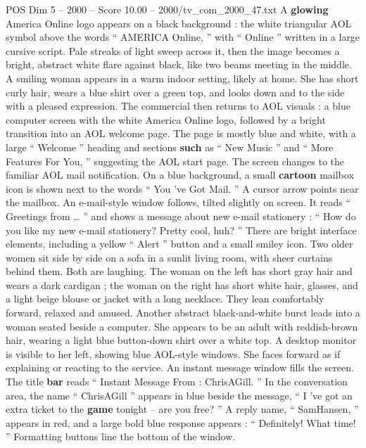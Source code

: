 \begin{textsample}{POS Dim 5 – 2000 – Score 10.00 – 2000/tv\_com\_2000\_47.txt}  \label{ex:f5_pos_023}
A \textbf{glowing} America Online logo appears on a black background : the white triangular AOL symbol above the words “ AMERICA Online, ” with “ Online ” written in a large cursive script.
Pale streaks of light sweep across it, then the image becomes a bright, abstract white flare against black, like two beams meeting in the middle.
A smiling woman appears in a warm indoor setting, likely at home.
She has short curly hair, wears a blue shirt over a green top, and looks down and to the side with a pleased expression.
The commercial then returns to AOL visuals : a blue computer screen with the white America Online logo, followed by a bright transition into an AOL welcome page.
The page is mostly blue and white, with a large “ Welcome ” heading and sections \textbf{such} as “ New Music ” and “ More Features For You, ” suggesting the AOL start page.
The screen changes to the familiar AOL mail notification.
On a blue background, a small \textbf{cartoon} mailbox icon is shown next to the words “ You ’ve Got Mail. ” A cursor arrow points near the mailbox.
An e-mail-style window follows, tilted slightly on screen.
It reads “ Greetings from … ” and shows a message about new e-mail stationery : “ How do you like my new e-mail stationery?
Pretty cool, huh? ” There are bright interface elements, including a yellow “ Alert ” button and a small smiley icon.
Two older women sit side by side on a sofa in a sunlit living room, with sheer curtains behind them.
Both are laughing.
The woman on the left has short gray hair and wears a dark cardigan ; the woman on the right has short white hair, glasses, and a light beige blouse or jacket with a long necklace.
They lean comfortably forward, relaxed and amused.
Another abstract black-and-white burst leads into a woman seated beside a computer.
She appears to be an adult with reddish-brown hair, wearing a light blue button-down shirt over a white top.
A desktop monitor is visible to her left, showing blue AOL-style windows.
She faces forward as if explaining or reacting to the service.
An instant message window fills the screen.
The title \textbf{bar} reads “ Instant Message From : ChrisAGill. ” In the conversation area, the name “ ChrisAGill ” appears in blue beside the message, “ I ’ve got an extra ticket to the \textbf{game} tonight -- are you free? ” A reply name, “ SamHansen, ” appears in red, and a large bold blue response appears : “ Definitely!
What time! ” Formatting buttons line the bottom of the window.

\end{textsample}
